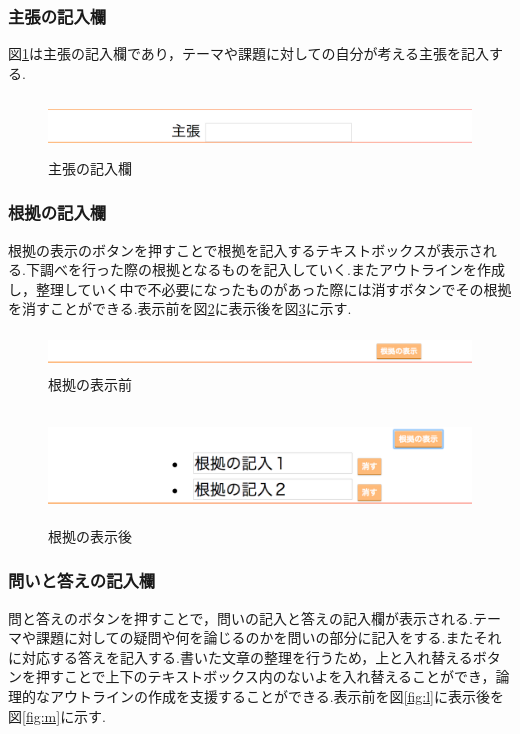 \documentclass[a4j,12pt]{jarticle}
\begin{document}
\subsubsection{主張の記入欄}
図\ref{fig:i}は主張の記入欄であり，テーマや課題に対しての自分が考える主張を記入する.
\begin{figure}[h]
\begin{center}
 \includegraphics[clip,width=150mm,height=15mm]{01shucho.png}
\end{center}
 \caption{主張の記入欄}
 \label{fig:i}
\end{figure}
\newpage
\subsubsection{根拠の記入欄}
根拠の表示のボタンを押すことで根拠を記入するテキストボックスが表示される.下調べを行った際の根拠となるものを記入していく.またアウトラインを作成し，整理していく中で不必要になったものがあった際には消すボタンでその根拠を消すことができる.表示前を図\ref{fig:j}に表示後を図\ref{fig:k}に示す.
\begin{figure}[h]
\begin{center}
 \includegraphics[clip,width=150mm,height=10mm]{02konkyo.png}
\end{center}
 \caption{根拠の表示前}
 \label{fig:j}
\end{figure}

\begin{figure}[h]
\begin{center}
 \includegraphics[clip,width=150mm,height=30mm]{03konkuo.png}
\end{center}
 \caption{根拠の表示後}
 \label{fig:k}
\end{figure}

\newpage
\subsubsection{問いと答えの記入欄}
問と答えのボタンを押すことで，問いの記入と答えの記入欄が表示される.テーマや課題に対しての疑問や何を論じるのかを問いの部分に記入をする.またそれに対応する答えを記入する.書いた文章の整理を行うため，上と入れ替えるボタンを押すことで上下のテキストボックス内のないよを入れ替えることができ，論理的なアウトラインの作成を支援することができる.表示前を図\ref{fig:l}に表示後を図\ref{fig:m}に示す.
\end{document}
